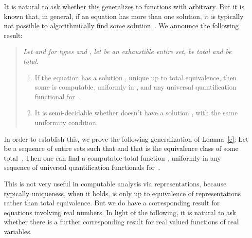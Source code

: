 \documentclass{LMCS}
\begin{document}
\pagebreak[4]
It is natural to ask whether this generalizes to functions  with  arbitrary. But it is known that, in general, if an
equation has more than one solution, it is typically not possible to
algorithmically find some solution~\cite{beeson}.  We announce the
following result: \pagebreak[3]
\begin{quote} \em Let  and  for types  and , let  be an
  exhaustible entire set,  be total and 
  be total.
\begin{enumerate}
\item If the equation  has a solution , unique
  up to total equivalence, then some  is computable,
  uniformly in ,  and any universal quantification functional
  for~.
\item It is semi-decidable whether  doesn't have a
  solution , with the same uniformity condition.
\end{enumerate}
\end{quote}
In order to establish this, we prove the following generalization of
Lemma~\ref{c}: Let  be a sequence
of entire sets such that  and that  is the equivalence class of some total~. Then one can find a
computable total function , uniformly in any sequence of
universal quantification functionals for~.

This is not very useful in computable analysis via representations,
because typically uniqueness, when it holds, is only up to
equivalence of representations rather than total equivalence. But we
do have a corresponding result for equations involving real numbers.
In light of the following, it is natural to ask whether there is a
further corresponding result for real valued functions of real
variables.
\end{document}

